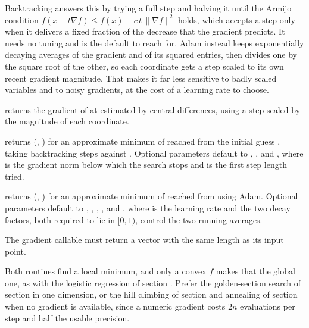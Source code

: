 Backtracking answers this by trying a full step and halving it until the Armijo condition $f(x - t\nabla f) \leq f(x) - c\,t\,\|\nabla f\|^2$ holds, which accepts a step only when it delivers a fixed fraction of the decrease that the gradient predicts. It needs no tuning and is the default to reach for. Adam instead keeps exponentially decaying averages of the gradient and of its squared entries, then divides one by the square root of the other, so each coordinate gets a step scaled to its own recent gradient magnitude. That makes it far less sensitive to badly scaled variables and to noisy gradients, at the cost of a learning rate to choose.

\begin{compactitem}
  \item {} returns the gradient of  at  estimated by central differences, using a step scaled by the magnitude of each coordinate.
  \item {} returns (, ) for an approximate minimum of  reached from the initial guess , taking backtracking steps against . Optional parameters default to , , and , where  is the gradient norm below which the search stops and  is the first step length tried.
  \item {} returns (, ) for an approximate minimum of  reached from  using Adam. Optional parameters default to , , , , and , where  is the learning rate and the two decay factors, both required to lie in $[0, 1)$, control the two running averages.
\end{compactitem}

The gradient callable must return a vector with the same length as its input point.

Both routines find a local minimum, and only a convex $f$ makes that the global one, as with the logistic regression of section . Prefer the golden-section search of section  in one dimension, or the hill climbing of section  and annealing of section  when no gradient is available, since a numeric gradient costs $2n$ evaluations per step and half the usable precision.

